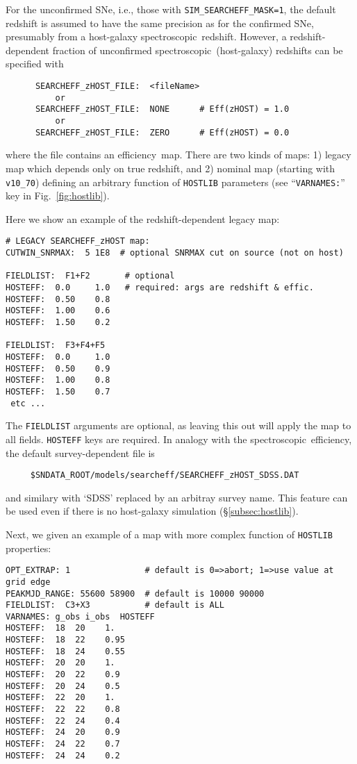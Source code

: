\documentclass[12pt]{article}
\newcommand{\eff}{efficiency}
\newcommand{\spec}{spectroscopic}
\begin{document}
{For the unconfirmed SNe, i.e., those with {\tt SIM\_SEARCHEFF\_MASK=1},
the default redshift is assumed to have the same precision as for 
the confirmed SNe, presumably from a host-galaxy \spec\ redshift. 
However, a redshift-dependent fraction of unconfirmed 
\spec\ (host-galaxy) redshifts can be specified with
%
\begin{verbatim}
      SEARCHEFF_zHOST_FILE:  <fileName>
          or
      SEARCHEFF_zHOST_FILE:  NONE      # Eff(zHOST) = 1.0
          or
      SEARCHEFF_zHOST_FILE:  ZERO      # Eff(zHOST) = 0.0
\end{verbatim}
%
where the file contains an \eff\ map.  There are two kinds of maps:
1) legacy map which depends only on true redshift, and 
2) nominal map (starting with {\tt v10\_70}) defining an arbitrary 
function of {\tt HOSTLIB} parameters
(see ``{\tt VARNAMES:}''  key in Fig.~\ref{fig:hostlib}).

Here we show an example of the redshift-dependent legacy map:
\begin{Verbatim}[frame=single]
# LEGACY SEARCHEFF_zHOST map:
CUTWIN_SNRMAX:  5 1E8  # optional SNRMAX cut on source (not on host)

FIELDLIST:  F1+F2       # optional 
HOSTEFF:  0.0     1.0   # required: args are redshift & effic.
HOSTEFF:  0.50    0.8
HOSTEFF:  1.00    0.6
HOSTEFF:  1.50    0.2

FIELDLIST:  F3+F4+F5
HOSTEFF:  0.0     1.0
HOSTEFF:  0.50    0.9
HOSTEFF:  1.00    0.8
HOSTEFF:  1.50    0.7
 etc ...
\end{Verbatim}                             
The {\tt FIELDLIST} arguments are optional, as leaving this out
will apply the map to all fields. {\tt HOSTEFF} keys are required.
In analogy with the \spec\ efficiency, the default 
survey-dependent file is
\begin{verbatim}
     $SNDATA_ROOT/models/searcheff/SEARCHEFF_zHOST_SDSS.DAT
\end{verbatim}
and similary with `SDSS' replaced by an arbitray survey name.
This feature can be used even if there is no host-galaxy 
simulation (\S\ref{subsec:hostlib}).

\clearpage
Next, we given an example of a map with more complex function
of {\tt HOSTLIB} properties:
%
\begin{Verbatim}[frame=single]
OPT_EXTRAP: 1               # default is 0=>abort; 1=>use value at grid edge
PEAKMJD_RANGE: 55600 58900  # default is 10000 90000
FIELDLIST:  C3+X3           # default is ALL
VARNAMES: g_obs i_obs  HOSTEFF
HOSTEFF:  18  20    1.
HOSTEFF:  18  22    0.95
HOSTEFF:  18  24    0.55
HOSTEFF:  20  20    1.
HOSTEFF:  20  22    0.9
HOSTEFF:  20  24    0.5
HOSTEFF:  22  20    1.
HOSTEFF:  22  22    0.8
HOSTEFF:  22  24    0.4
HOSTEFF:  24  20    0.9
HOSTEFF:  24  22    0.7
HOSTEFF:  24  24    0.2


\end{Verbatim}}
\end{document}
